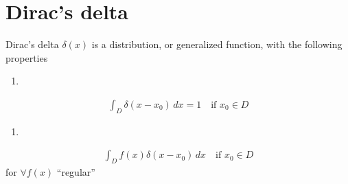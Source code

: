 \documentclass[letterpaper,10pt,english]{jupyterBook}
\begin{document}
\section{Dirac’s delta}
\label{\detokenize{ch/functional-analysis/dirac-delta:dirac-s-delta}}\label{\detokenize{ch/functional-analysis/dirac-delta:functional-analysis-dirac-delta}}
\sphinxAtStartPar
Dirac’s delta \(\delta(x)\) is a distribution, or generalized function, with the following properties
\begin{enumerate}
%
\item {} 
\end{enumerate}
\begin{equation*}
\begin{split}\int_{D} \delta(x-x_0) \, dx = 1  \quad \text{if $x_0 \in D$}\end{split}
\end{equation*}\begin{enumerate}
%
\setcounter{enumi}{1}
\item {} 
\end{enumerate}
\begin{equation*}
\begin{split}\int_{D} f(x) \delta(x-x_0) \, dx \quad \text{if $x_0 \in D$}\end{split}
\end{equation*}
\sphinxAtStartPar
for \(\forall f(x)\) “regular”  
\end{document}
